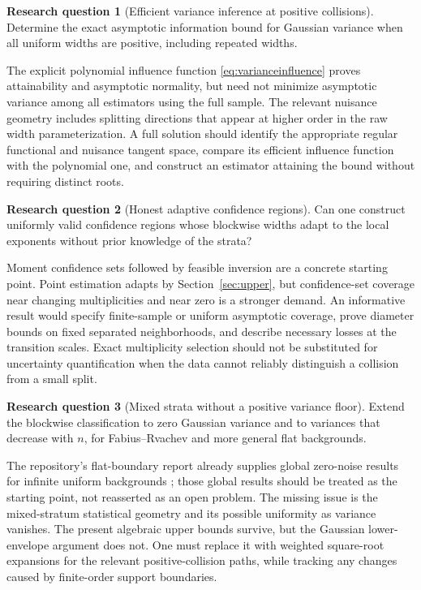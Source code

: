 \documentclass[11pt,a4paper]{article}
\numberwithin{equation}{section}
\theoremstyle{definition}
\newtheorem{question}{Research question}
\theoremstyle{remark}
\begin{document}
\begin{question}[Efficient variance inference at positive collisions]
Determine the exact asymptotic information bound for Gaussian variance when
all uniform widths are positive, including repeated widths.
\end{question}
The explicit polynomial influence function \eqref{eq:varianceinfluence}
proves attainability and asymptotic normality, but need not minimize asymptotic
variance among all estimators using the full sample. The relevant nuisance
geometry includes splitting directions that appear at higher order in the
raw width parameterization. A full solution should identify the appropriate
regular functional and nuisance tangent space, compare its efficient influence
function with the polynomial one, and construct an estimator attaining the
bound without requiring distinct roots.

\begin{question}[Honest adaptive confidence regions]
Can one construct uniformly valid confidence regions whose blockwise widths
adapt to the local exponents without prior knowledge of the strata?
\end{question}
Moment confidence sets followed by feasible inversion are a concrete starting
point. Point estimation adapts by Section~\ref{sec:upper}, but confidence-set
coverage near changing multiplicities and near zero is a stronger demand.
An informative result would specify finite-sample or uniform asymptotic
coverage, prove diameter bounds on fixed separated neighborhoods, and describe
necessary losses at the transition scales. Exact multiplicity selection should
not be substituted for uncertainty quantification when the data cannot
reliably distinguish a collision from a small split.

\begin{question}[Mixed strata without a positive variance floor]
Extend the blockwise classification to zero Gaussian variance and to variances
that decrease with $n$, for Fabius--Rvachev and more general flat backgrounds.
\end{question}
The repository's flat-boundary report already supplies global zero-noise
results for infinite uniform backgrounds \cite{RepoFlat}; those global results
should be treated as the starting point, not reasserted as an open problem.
The missing issue is the mixed-stratum statistical geometry and its possible
uniformity as variance vanishes. The present algebraic upper bounds survive,
but the Gaussian lower-envelope argument does not. One must replace it with
weighted square-root expansions for the relevant positive-collision paths,
while tracking any changes caused by finite-order support boundaries.
\end{document}
